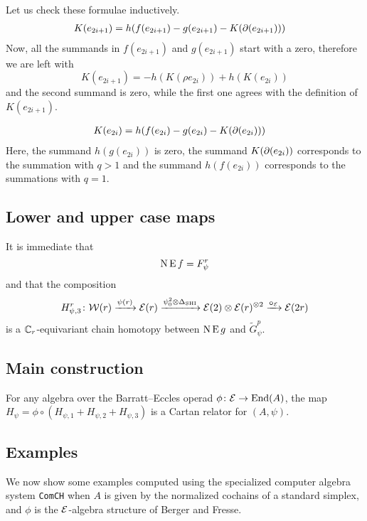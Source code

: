 Let us check these formulae inductively.
\begin{align*}
	K(e_{2i+1}) &= h(f(e_{2i+1})-g(e_{2i+1})-K(\operatorname{\partial}(e_{2i+1})))
\end{align*}
Now, all the summands in $f(e_{2i+1})$ and $g(e_{2i+1})$ start with a zero, therefore we are left with
\[K(e_{2i+1}) = -h(K(\rho e_{2i}))+h(K(e_{2i}))\]
and the second summand is zero, while the first one agrees with the definition of $K(e_{2i+1})$.

\begin{align*}
	K(e_{2i}) &= h(f(e_{2i})-g(e_{2i})-K(\operatorname{\partial}(e_{2i})))
\end{align*}
Here, the summand $h(g(e_{2i}))$ is zero, the summand $K(\operatorname{\partial}(e_{2i}))$ corresponds to the summation with $q>1$ and the summand $h(f(e_{2i}))$ corresponds to the summations with $q=1$.


\subsection{Lower and upper case maps}

It is immediate that
\[
\operatorname{N}\operatorname{E} f = F_\psi^r
\]
and that the composition
\[
H_{\psi,3}^r \colon \mathcal{W}(r) \xrightarrow{\psi(r)} \mathcal{E}(r) \xrightarrow{\psi^2_0 \otimes \Delta_{\mathrm{SHI}}} \mathcal{E}(2) \otimes \mathcal{E}(r)^{\otimes 2} \xrightarrow{\bm{\circ}_{\mathcal{E}}} \mathcal{E}(2r)
\]
is a $\mathbb{C}_r$-equivariant chain homotopy between $\operatorname{N}\operatorname{E} g$ and $\widetilde G_\psi^p$.

\subsection{Main construction}

\begin{theorem}
	For any algebra over the Barratt--Eccles operad $\phi \colon \mathcal{E} \to \mathrm{End}(A)$, the map $H_\psi = \phi \circ (H_{\psi,1} + H_{\psi,2} + H_{\psi,3})$ is a Cartan relator for $(A,\psi)$.
\end{theorem}

\subsection{Examples}

We now show some examples computed using the specialized computer algebra system \texttt{ComCH} \cite{medina2021comch} when $A$ is given by the normalized cochains of a standard simplex, and $\phi$ is the $\mathcal{E}$-algebra structure of Berger and Fresse.
